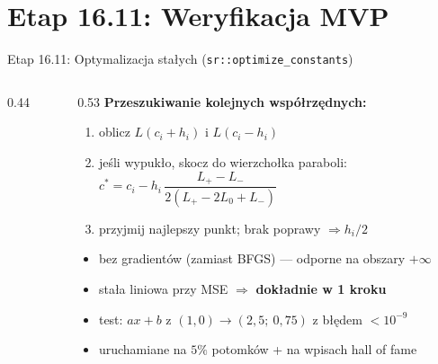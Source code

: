 \documentclass[
  polish,
  aspectratio=169,
]{beamer}
\begin{document}
\section{Etap 16.11: Weryfikacja MVP}
\begin{frame}{Etap 16.11: Optymalizacja stałych (\texttt{sr::optimize\_constants})}
  \begin{columns}[c]
    \begin{column}{0.44\textwidth}
    \end{column}
    \begin{column}{0.53\textwidth}
      \textbf{Przeszukiwanie kolejnych współrzędnych:}
      \begin{enumerate}\footnotesize
        \item oblicz $L(c_i + h_i)$ i $L(c_i - h_i)$
        \item jeśli wypukło, skocz do wierzchołka paraboli:\\
          $c^* = c_i - h_i\,\dfrac{L_+ - L_-}{2(L_+ - 2L_0 + L_-)}$
        \item przyjmij najlepszy punkt; brak poprawy $\Rightarrow h_i / 2$
      \end{enumerate}
      \begin{itemize}\footnotesize
        \item bez gradientów (zamiast BFGS) --- odporne na obszary $+\infty$
        \item stała liniowa przy MSE $\Rightarrow$ \textcolor{aghred}{\textbf{dokładnie w 1 kroku}}
        \item test: $a x + b$ z $(1,0) \to (2{,}5;\ 0{,}75)$ z błędem $< 10^{-9}$
        \item uruchamiane na $5\%$ potomków + na wpisach hall of fame
      \end{itemize}
    \end{column}
  \end{columns}
\end{frame}
\end{document}
